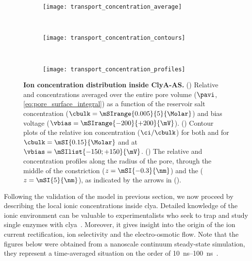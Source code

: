 %
\begin{figure*}[p]
  \centering

  \begin{subfigure}[t]{9cm}
    \centering
    \caption{}\vspace{-3mm}\label{fig:transport_concentration_average}
    \texttt{[image: transport\_concentration\_average]}
  \end{subfigure}
  \\
  \begin{subfigure}[t]{11.5cm}
    \centering
    \caption{}\vspace{-3mm}\label{fig:transport_concentration_contours}
    \texttt{[image: transport\_concentration\_contours]}
  \end{subfigure}
  \\
  \begin{subfigure}[t]{11.5cm}
    \centering
    \caption{}\vspace{-3mm}\label{fig:transport_concentration_profiles}
    \texttt{[image: transport\_concentration\_profiles]}
  \end{subfigure}

  \caption[Ion concentration distribution inside {ClyA-AS}]%
  {%
    \textbf{Ion concentration distribution inside {ClyA-AS}.}
    ()
    Relative \Na{} and \Cl{} concentrations averaged over the entire pore volume ($\pavi$,
    \cref{eq:pore_surface_integral}) as a function of the reservoir salt concentration ($\cbulk =
    \mSIrange{0.005}{5}{\Molar}$) and bias voltage ($\vbias = \mSIrange{-200}{+200}{\mV}$).
    ()
    Contour plots of the relative ion concentration ($\ci/\cbulk$) for both \Na{} and \Cl{} for $\cbulk =
    \mSI{0.15}{\Molar}$ and at $\vbias = \mSIlist{-150;+150}{\mV}$.
    ()
    The relative \Na{} and \Cl{} concentration profiles along the radius of the pore, through the middle of
    the constriction ($z = \mSI{-0.3}{\nm}$) and the \lumen{} ($z = \mSI{5}{\nm}$), as indicated by the arrows
    in ().
    }\label{fig:transport_concentration}
\end{figure*}
%


Following the validation of the model in previous section, we now proceed by describing the local ionic
concentrations inside \gls{clya}. Detailed knowledge of the ionic environment can be valuable to
experimentalists who seek to trap and study single enzymes with
\gls{clya}~\cite{Soskine-Biesemans-2015,VanMeervelt-2017,Galenkamp-2018}. Moreover, it gives insight into the
origin of the ion current rectification, ion selectivity and the electro-osmotic flow. Note that the figures
below were obtained from a nanoscale continuum steady-state simulation, they represent a time-averaged
situation on the order of \SIrange{10}{100}{\ns}~\cite{Im-2002}.


